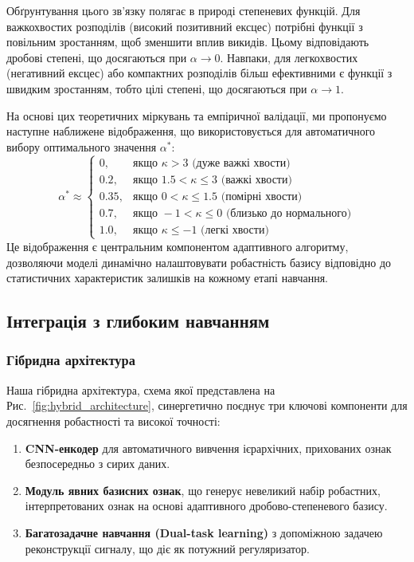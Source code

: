\documentclass[12pt,a4paper]{article}
\begin{document}
Обґрунтування цього зв'язку полягає в природі степеневих функцій. Для важкохвостих розподілів (високий позитивний ексцес) потрібні функції з повільним зростанням, щоб зменшити вплив викидів. Цьому відповідають дробові степені, що досягаються при $\alpha \to 0$. Навпаки, для легкохвостих (негативний ексцес) або компактних розподілів більш ефективними є функції з швидким зростанням, тобто цілі степені, що досягаються при $\alpha \to 1$.

На основі цих теоретичних міркувань та емпіричної валідації, ми пропонуємо наступне наближене відображення, що використовується для автоматичного вибору оптимального значення $\alpha^*$:
\begin{equation}
	\label{eq:adaptive_powers_piecewise}
	\alpha^* \approx \begin{cases}
		0, & \text{якщо } \kappa > 3 \text{ (дуже важкі хвости)} \\
		0.2, & \text{якщо } 1.5 < \kappa \leq 3 \text{ (важкі хвости)} \\
		0.35, & \text{якщо } 0 < \kappa \leq 1.5 \text{ (помірні хвости)} \\
		0.7, & \text{якщо } -1 < \kappa \leq 0 \text{ (близько до нормального)} \\
		1.0, & \text{якщо } \kappa \leq -1 \text{ (легкі хвости)}
	\end{cases}
\end{equation}
Це відображення є центральним компонентом адаптивного алгоритму, дозволяючи моделі динамічно налаштовувати робастність базису відповідно до статистичних характеристик залишків на кожному етапі навчання.

\subsection{Інтеграція з глибоким навчанням}

\subsubsection{Гібридна архітектура}

Наша гібридна архітектура, схема якої представлена на Рис.~\ref{fig:hybrid_architecture}, синергетично поєднує три ключові компоненти для досягнення робастності та високої точності:
\begin{enumerate}
	\item \textbf{CNN-енкодер} для автоматичного вивчення ієрархічних, прихованих ознак безпосередньо з сирих даних.
	\item \textbf{Модуль явних базисних ознак}, що генерує невеликий набір робастних, інтерпретованих ознак на основі адаптивного дробово-степеневого базису.
	\item \textbf{Багатозадачне навчання (Dual-task learning)} з допоміжною задачею реконструкції сигналу, що діє як потужний регуляризатор.
\end{enumerate}
\end{document}
